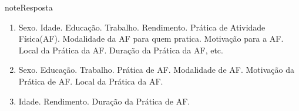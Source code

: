 \begin{sphinxadmonition}{note}{Resposta}
\begin{enumerate}
\item {} 
Sexo. Idade. Educação. Trabalho. Rendimento. Prática de Atividade Física(AF). Modalidade da AF para quem pratica. Motivação para a AF. Local da Prática da AF. Duração da Prática da AF, etc.

\item {} 
Sexo. Educação. Trabalho. Prática de AF. Modalidade de AF. Motivação da Prática de AF. Local da Prática da AF.

\item {} 
Idade. Rendimento. Duração da Prática de AF.

\end{enumerate}
\end{sphinxadmonition}
\label{\detokenize{PE103-0:ativ4-analise-de-infograficos}}
